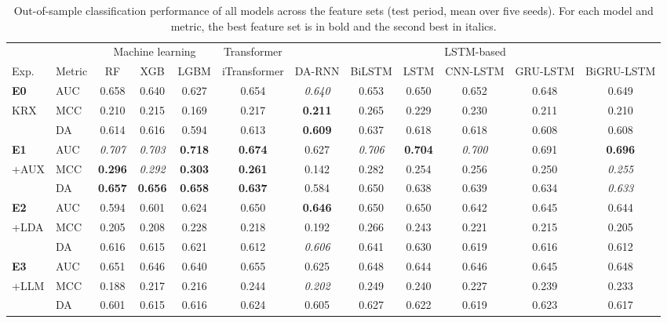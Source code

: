 \begin{table}[t]
\caption{Out-of-sample classification performance of all models across the feature sets (test period, mean over five seeds). For each model and metric, the best feature set is in bold and the second best in italics.}
\label{tbl:performance}
\centering\scriptsize
\setlength{\tabcolsep}{3.6pt}
\renewcommand{\arraystretch}{0.95}
\begin{tabular}{@{} l l cccccccccc @{}}
\toprule
 & & \multicolumn{3}{c}{Machine learning} & \multicolumn{1}{c}{Transformer} & \multicolumn{6}{c}{LSTM-based} \\
\cmidrule(lr){3-5} \cmidrule(lr){6-6} \cmidrule(lr){7-12}
Exp. & Metric & RF & XGB & LGBM & iTransformer & DA-RNN & BiLSTM & LSTM & CNN-LSTM & GRU-LSTM & BiGRU-LSTM \\
\midrule
\textbf{E0} & AUC & 0.658 & 0.640 & 0.627 & 0.654 & \textit{0.640} & 0.653 & 0.650 & 0.652 & 0.648 & 0.649 \\
KRX & MCC & 0.210 & 0.215 & 0.169 & 0.217 & \textbf{0.211} & 0.265 & 0.229 & 0.230 & 0.211 & 0.210 \\
 & DA & 0.614 & 0.616 & 0.594 & 0.613 & \textbf{0.609} & 0.637 & 0.618 & 0.618 & 0.608 & 0.608 \\
\midrule
\textbf{E1} & AUC & \textit{0.707} & \textit{0.703} & \textbf{0.718} & \textbf{0.674} & 0.627 & \textit{0.706} & \textbf{0.704} & \textit{0.700} & 0.691 & \textbf{0.696} \\
+AUX & MCC & \textbf{0.296} & \textit{0.292} & \textbf{0.303} & \textbf{0.261} & 0.142 & 0.282 & 0.254 & 0.256 & 0.250 & \textit{0.255} \\
 & DA & \textbf{0.657} & \textbf{0.656} & \textbf{0.658} & \textbf{0.637} & 0.584 & 0.650 & 0.638 & 0.639 & 0.634 & \textit{0.633} \\
\midrule
\textbf{E2} & AUC & 0.594 & 0.601 & 0.624 & 0.650 & \textbf{0.646} & 0.650 & 0.650 & 0.642 & 0.645 & 0.644 \\
+LDA & MCC & 0.205 & 0.208 & 0.228 & 0.218 & 0.192 & 0.266 & 0.243 & 0.221 & 0.215 & 0.205 \\
 & DA & 0.616 & 0.615 & 0.621 & 0.612 & \textit{0.606} & 0.641 & 0.630 & 0.619 & 0.616 & 0.612 \\
\midrule
\textbf{E3} & AUC & 0.651 & 0.646 & 0.640 & 0.655 & 0.625 & 0.648 & 0.644 & 0.646 & 0.645 & 0.648 \\
+LLM & MCC & 0.188 & 0.217 & 0.216 & 0.244 & \textit{0.202} & 0.249 & 0.240 & 0.227 & 0.239 & 0.233 \\
 & DA & 0.601 & 0.615 & 0.616 & 0.624 & 0.605 & 0.627 & 0.622 & 0.619 & 0.623 & 0.617 \\

\end{tabular}
\end{table}
